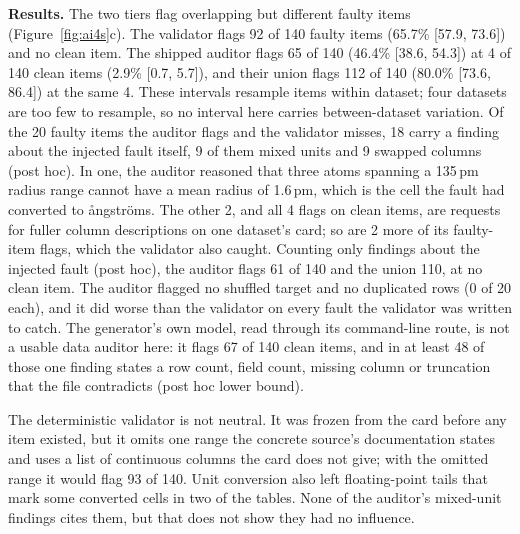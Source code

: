 \textbf{Results.} The two tiers flag overlapping but different faulty items (Figure~\ref{fig:ai4s}c). The validator flags
92 of 140 faulty items (65.7\% [57.9, 73.6]) and no clean item. The shipped auditor flags 65 of 140
(46.4\% [38.6, 54.3]) at 4 of 140 clean items (2.9\% [0.7, 5.7]), and their union flags 112 of 140
(80.0\% [73.6, 86.4]) at the same 4. These intervals resample items within dataset; four datasets
are too few to resample, so no interval here carries between-dataset variation. Of the 20 faulty
items the auditor flags and the validator misses, 18 carry a finding about the injected fault
itself, 9 of them mixed units and 9 swapped columns (post hoc). In one, the auditor reasoned that
three atoms spanning a 135\,pm radius range cannot have a mean radius of 1.6\,pm, which is the cell
the fault had converted to {\aa}ngstr\"oms. The other 2, and all 4 flags on clean items, are requests for
fuller column descriptions on one dataset's card; so are 2 more of its faulty-item flags, which the
validator also caught. Counting only findings about the injected fault (post hoc), the auditor flags
61 of 140 and the union 110, at no clean item. The auditor flagged no shuffled target and no
duplicated rows (0 of 20 each), and it did worse than the validator on every fault the validator
was written to catch. The generator's own model, read through its command-line route, is not a usable
data auditor here: it flags 67 of 140 clean items, and in at least 48 of those one finding states a
row count, field count, missing column or truncation that the file contradicts (post hoc lower
bound).

The deterministic validator is not neutral. It was frozen from the card before any item existed,
but it omits one range the concrete source's documentation states and uses a list of continuous
columns the card does not give; with the omitted range it would flag 93 of 140. Unit conversion
also left floating-point tails that mark some converted cells in two of the tables. None of the
auditor's mixed-unit findings cites them, but that does not show they had no influence.

